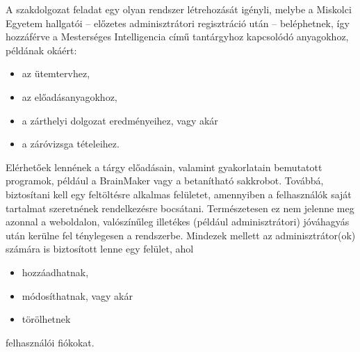 


A szakdolgozat feladat egy olyan rendszer létrehozását igényli, melybe a Miskolci Egyetem hallgatói – előzetes adminisztrátori regisztráció után – beléphetnek, így hozzáférve a Mesterséges Intelligencia című tantárgyhoz kapcsolódó anyagokhoz, példának okáért:

\begin{itemize}
\item az ütemtervhez,
\item az előadásanyagokhoz,
\item a zárthelyi dolgozat eredményeihez, vagy akár
\item a záróvizsga tételeihez.
\end{itemize}

Elérhetőek lennének a tárgy előadásain, valamint gyakorlatain bemutatott programok, például a BrainMaker vagy a betanítható sakkrobot. Továbbá, biztosítani kell egy feltöltésre alkalmas felületet, amennyiben a felhasználók saját tartalmat szeretnének rendelkezésre bocsátani. Természetesen ez nem jelenne meg azonnal a weboldalon, valószínűleg illetékes (például adminisztrátori) jóváhagyás után kerülne fel ténylegesen a rendszerbe. Mindezek mellett az adminisztrátor(ok) számára is biztosított lenne egy felület, ahol
\begin{itemize}
\item hozzáadhatnak,
\item módosíthatnak, vagy akár
\item törölhetnek
\end{itemize}felhasználói fiókokat.



